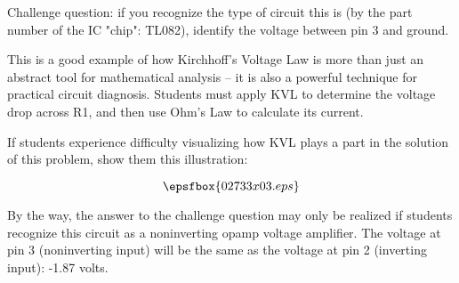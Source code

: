 \vskip 10pt

Challenge question: if you recognize the type of circuit this is (by the part number of the IC "chip": TL082), identify the voltage between pin 3 and ground.







This is a good example of how Kirchhoff's Voltage Law is more than just an abstract tool for mathematical analysis -- it is also a powerful technique for practical circuit diagnosis.  Students must apply KVL to determine the voltage drop across R1, and then use Ohm's Law to calculate its current.

If students experience difficulty visualizing how KVL plays a part in the solution of this problem, show them this illustration:

$$\epsfbox{02733x03.eps}$$

By the way, the answer to the challenge question may only be realized if students recognize this circuit as a noninverting opamp voltage amplifier.  The voltage at pin 3 (noninverting input) will be the same as the voltage at pin 2 (inverting input): -1.87 volts.





